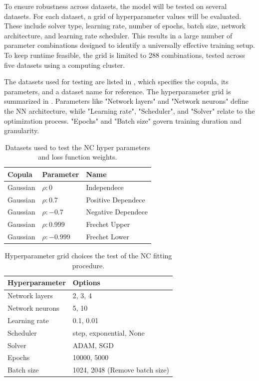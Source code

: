 To ensure robustness across datasets, the model will be tested on several datasets. For each dataset, a grid of hyperparameter values will be evaluated. These include solver type, learning rate, number of epochs, batch size, network architecture, and learning rate scheduler. This results in a large number of parameter combinations designed to identify a universally effective training setup. To keep runtime feasible, the grid is limited to 288 combinations, tested across five datasets using a computing cluster.

The datasets used for testing are listed in , which specifies the copula, its parameters, and a dataset name for reference. The hyperparameter grid is summarized in . Parameters like "Network layers" and "Network neurons" define the \gls{NN} architecture, while "Learning rate", "Scheduler", and "Solver" relate to the optimization process. "Epochs" and "Batch size" govern training duration and granularity.

\begin{table}[h!]
    \centering
    \caption{Datasets used to test the \gls{NC} hyper parameters and loss function weights.}
    \begin{tabular}{lll}
    \textbf{Copula} & \textbf{Parameter} & \textbf{Name}  \\
    \hline
    Gaussian & $\rho:0$ & Independece \\
    Gaussian & $\rho:0.7$ & Positive Dependece \\
    Gaussian & $\rho:-0.7$ & Negative Dependece  \\
    Gaussian & $\rho:0.999$ & Frechet Upper \\
    Gaussian & $\rho:-0.999$ & Frechet Lower \\
    \end{tabular}
    \label{tab:DatasetsTestedOn}
\end{table}

\begin{table}[h!]
    \centering
    \caption{Hyperparameter grid choices the test of the \gls{NC} fitting procedure.}
    \begin{tabular}{ll}
    \textbf{Hyperparameter} & \textbf{Options} \\
    \hline
    Network layers & 2, 3, 4 \\
    Network neurons & 5, 10 \\
    Learning rate & 0.1, 0.01 \\
    Scheduler & step, exponential, None \\
    Solver & ADAM, SGD \\
    Epochs & 10000, 5000 \\
    Batch size & 1024, 2048 (Remove batch size) \\
    \end{tabular}
    \label{tab:se_hyperparams}
\end{table}

